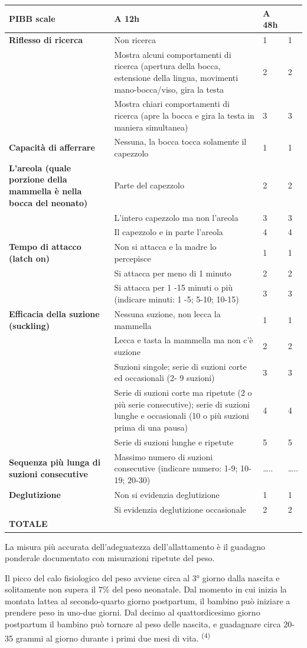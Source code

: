 \documentclass[]{article}
\begin{document}
\begin{longtable}[]{@{}llll@{}}
\toprule
\textbf{PIBB scale} & \textbf{A 12h} & \textbf{A 48h} &\tabularnewline
\midrule
\endhead
\textbf{Riflesso di ricerca} & Non ricerca & 1 & 1\tabularnewline
& Mostra alcuni comportamenti di ricerca (apertura della bocca,
estensione della lingua, movimenti mano-bocca/viso, gira la testa & 2 &
2\tabularnewline
& Mostra chiari comportamenti di ricerca (apre la bocca e gira la testa
in maniera simultanea) & 3 & 3\tabularnewline
\textbf{Capacità di afferrare} & Nessuna, la bocca tocca solamente il
capezzolo & 1 & 1\tabularnewline
\textbf{L'areola (quale porzione della mammella è nella bocca del
neonato)} & Parte del capezzolo & 2 & 2\tabularnewline
& L'intero capezzolo ma non l'areola & 3 & 3\tabularnewline
& Il capezzolo e in parte l'areola & 4 & 4\tabularnewline
\textbf{Tempo di attacco (latch on)} & Non si attacca e la madre lo
percepisce & 1 & 1\tabularnewline
& Si attacca per meno di 1 minuto & 2 & 2\tabularnewline
& Si attacca per 1 -15 minuti o più (indicare minuti: 1 -5; 5-10; 10-15)
& 3 & 3\tabularnewline
\textbf{Efficacia della suzione (suckling)} & Nessuna suzione, non lecca
la mammella & 1 & 1\tabularnewline
& Lecca e tasta la mammella ma non c'è suzione & 2 & 2\tabularnewline
& Suzioni singole; serie di suzioni corte ed occasionali (2- 9 suzioni)
& 3 & 3\tabularnewline
& Serie di suzioni corte ma ripetute (2 o più serie consecutive); serie
di suzioni lunghe e occasionali (10 o più suzioni prima di una pausa) &
4 & 4\tabularnewline
& Serie di suzioni lunghe e ripetute & 5 & 5\tabularnewline
\textbf{Sequenza più lunga di suzioni consecutive} & Massimo numero di
suzioni consecutive (indicare numero: 1-9; 10-19; 20-30) & \ldots{}.. &
\ldots{}..\tabularnewline
\textbf{Deglutizione} & Non si evidenzia deglutizione & 1 &
1\tabularnewline
& Si evidenzia deglutizione occasionale & 2 & 2\tabularnewline
\textbf{TOTALE} & & &\tabularnewline
\bottomrule
\end{longtable}

La misura più accurata dell'adeguatezza dell'allattamento è il guadagno
ponderale documentato con misurazioni ripetute del peso.

Il picco del calo fisiologico del peso avviene circa al 3° giorno dalla
nascita e solitamente non supera il 7\% del peso neonatale. Dal momento
in cui inizia la montata lattea al secondo-quarto giorno postpartum, il
bambino può iniziare a prendere peso in uno-due giorni. Dal decimo al
quattordicesimo giorno postpartum il bambino può tornare al peso delle
nascita, e guadagnare circa 20-35 grammi al giorno durante i primi due
mesi di vita. \textsuperscript{(4)}
\end{document}
